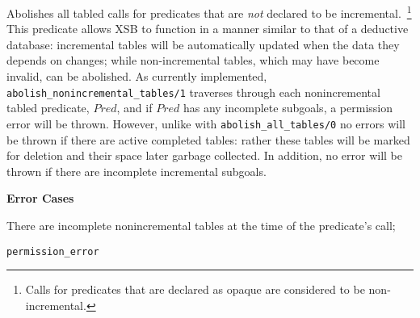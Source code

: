 \begin{description}
\begin{description}

%
Abolishes all tabled calls for predicates that are {\em not} declared
to be incremental.~\footnote{Calls for predicates that are declared as
  opaque are considered to be non-incremental.} This predicate
allows XSB to function in a manner similar to that of a deductive
database: incremental tables will be automatically updated when the
data they depends on changes; while non-incremental tables, which may
have become invalid, can be abolished.  As currently implemented, {\tt
  abolish\_nonincremental\_tables/1} traverses through each
nonincremental tabled predicate, $Pred$, and if $Pred$ has any
incomplete subgoals, a permission error will be thrown.  However,
unlike with {\tt abolish\_all\_tables/0} no errors will be thrown if
there are active completed tables: rather these tables will be marked
for deletion and their space later garbage collected.  In addition, no
error will be thrown if there are incomplete incremental subgoals.


{\bf Error Cases}
\bi
\item There are incomplete nonincremental tables at the time of the predicate's call;
\bi
\item 	{\tt permission\_error}
\ei
\ei



\end{description}
\end{description}
